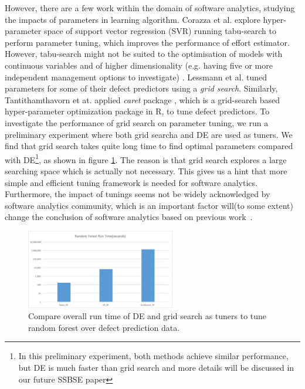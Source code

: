 However, there are a few work within the domain of software analytics, studying 
the impacts of parameters in learning algorithm. Corazza et al.\cite{corazza2010effective} 
explore hyper-parameter space of support vector regression (SVR) running tabu-search to perform parameter tuning, which improves the performance of effort estimator. However, 
tabu-search might not be suited to the optimisation of models
with continuous variables and of higher dimensionality 
(e.g. having five or more independent management options to
investigate) \cite{mayer1998tabu}. Lessmann et al.\cite{lessmann2008benchmarking}
tuned parameters for some of their defect predictors using  a {\em grid search}.
Similarly, Tantithamthavorn et at.\cite{tantithamthavorn2016automated} 
applied {\em caret} package \cite{kuhn2008caret}, which is a grid-search 
based hyper-parameter optimization package in R,  to tune defect predictors.
To investigate the performance of grid search on parameter tuning, we
run a preliminary experiment where both grid searcha and DE are
used as tuners.
We find that grid search takes quite long time to find 
optimal parameters compared with DE\footnote{In this preliminary experiment, both methods achieve similar performance, but DE is much faster than grid search and more details will be discussed in our future SSBSE paper}, as shown in figure \ref{fig:grid_runtime}. 
The reason is that grid search explores a large searching space which is actually not necessary. 
This gives us a hint that  more simple and efficient tuning framework is needed for software analytics.
Furthermore, the impact of tunings seems not be widely acknowledged by
software analytics community, which is an important factor will(to some extent) change
the conclusion of software analytics based on previous work~\cite{mayer1998tabu,tantithamthavorn2016automated}.

\begin{figure}[h]
\begin{center}
\includegraphics[width=6.5cm]{./eps/rf_runtime.png}
\end{center}
\caption{Compare overall run time of DE and grid search as tuners to tune random forest over defect prediction data.}\label{fig:grid_runtime}
\end{figure}

